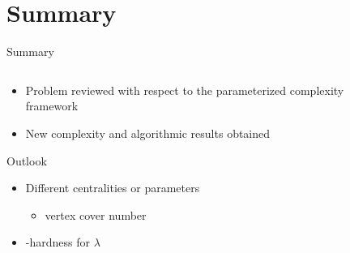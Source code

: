 \section*{Summary}

\begin{frame}{Summary}
  \begin{columns}
    \begin{column}{0.54\textwidth}
      \begin{itemize}
        \item Problem reviewed with respect to the parameterized complexity framework
        \item New complexity and algorithmic results obtained
      \end{itemize}

      \begin{center}
        Outlook
      \end{center}
      \begin{itemize}
        \item Different centralities or parameters
        \begin{itemize}
          \item vertex cover number
        \end{itemize}
        \item \Wone-hardness for $\lambda$ 
      \end{itemize}
    \end{column}

    \begin{column}{0.44\textwidth}
      
    \end{column}
  \end{columns}

\end{frame}
